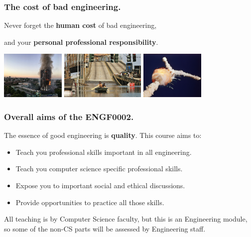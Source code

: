 \documentclass{beamer} %
\newcommand\emc[1]{\textcolor{midred}{\textbf{#1}}}
\begin{document}
\begin{frame}
\frametitle{The cost of bad engineering.}

Never forget the \emc{human cost} of bad engineering, 

and your \emc{personal professional responsibility}.

\vspace{10mm}
\centering
\includegraphics[height=23mm]{img/Grenfell.jpg} \quad
\includegraphics[height=23mm]{img/katrina.jpg} \quad
\includegraphics[height=23mm]{img/challenger.jpg}

\end{frame}

\begin{frame}
\frametitle{Overall aims of the ENGF0002.} 

The essence of good engineering is \emc{quality}. This course aims to:

\begin{itemize}
	\item Teach you professional skills important in all engineering.
	\item Teach you computer science specific professional skills.
	\item Expose you to important social and ethical discussions.
	\item Provide opportunities to practice all those skills.
\end{itemize}

\vspace{3mm} All teaching is by Computer Science faculty, but this is
an Engineering module, so some of the non-CS parts will be assessed by
Engineering staff.

\end{frame}
\end{document}
